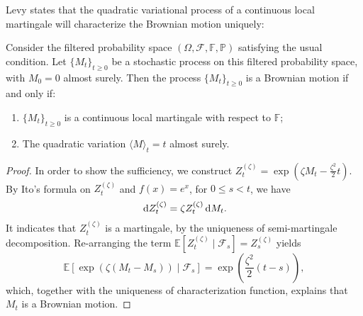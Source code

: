 \begin{example}
Levy states that the quadratic variational process of a continuous local martingale will characterize the Brownian motion uniquely:
\begin{theorem}
Consider the filtered probability space $(\Omega, \mathcal{F},\mathbb{F},\mathbb{P})$ satisfying the usual condition. Let $\{M_t\}_{t\ge0}$ be a stochastic process on this filtered probability space, with $M_0=0$ almost surely.
Then the process $\{M_t\}_{t\ge0}$ is a Brownian motion if and only if:
\begin{enumerate}
\item
$\{M_t\}_{t\ge0}$ is a continuous local martingale with respect to $\mathbb{F}$;
\item
The quadratic variation $\langle M\rangle_t=t$ almost surely.
\end{enumerate}
\end{theorem}
\begin{proof}
In order to show the sufficiency, we construct $Z_t^{(\zeta)}=\exp\left(
\zeta M_t - \frac{\zeta^2}{2}t
\right)$.
By Ito's formula on $Z_t^{(\zeta)}$ and $f(x)=e^x$, for $0\le s<t$, we have
\[
\,\mathrm{d} Z_t^{(\zeta)}=\zeta Z_t^{(\zeta)}\,\mathrm{d} M_t.
\]
It indicates that $Z_t^{(\zeta)}$ is a martingale, by the uniqueness of semi-martingale decomposition. Re-arranging the term $\mathbb{E}[Z_t^{(\zeta)}\mid\mathcal{F}_s]=Z_s^{(\zeta)}$ yields
\[
\mathbb{E}[\exp(\zeta(M_t - M_s))\mid\mathcal{F}_s] = \exp\left(
\frac{\zeta^2}{2}(t-s)
\right),
\]
which, together with the uniqueness of characterization function, explains that $M_t$ is a Brownian motion.
\end{proof}

\end{example}

